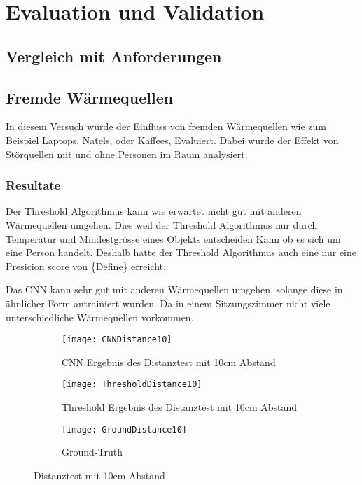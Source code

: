 \chapter{Evaluation und Validation}
\label{ch:Eval}

\section{Vergleich mit Anforderungen}
\label{sec:VergleichAnforderungen}

\section{Fremde Wärmequellen}
\label{sec:FremdeWärmequellen}

In diesem Versuch wurde der Einfluss von fremden Wärmequellen wie zum Beispiel Laptops, Natels, oder Kaffees, Evaluiert. Dabei wurde der Effekt von Störquellen mit und ohne Personen im Raum analysiert.

\subsection{Resultate}
\label{subsec:FWresultate}

Der Threshold Algorithmus kann wie erwartet nicht gut mit anderen Wärmequellen umgehen. Dies weil der Threshold Algorithmus nur durch Temperatur und Mindestgrösse eines Objekts entscheiden Kann ob es sich um eine Person handelt. Deshalb hatte der Threshold Algorithmus auch eine nur eine Presicion score von \{Define\} erreicht.

Das CNN kann sehr gut mit anderen Wärmequellen umgehen, solange diese in ähnlicher Form antrainiert wurden. Da in einem Sitzungszimmer nicht viele unterschiedliche Wärmequellen vorkommen.

\vspace{.5em}
\begin{figure}[h!]
	\begin{subfigure}{.5\linewidth}
		\texttt{[image: CNNDistance10]}
		\caption{CNN Ergebnis des Distanztest mit 10cm Abstand}
		\label{fig:cnnDistance10}
	\end{subfigure}\hfill%
	\begin{subfigure}{.5\linewidth}
		\centering
		\texttt{[image: ThresholdDistance10]}
		\caption{Threshold Ergebnis des Distanztest mit 10cm Abstand}
		\label{fig:thresholdDistance10}
	\end{subfigure}
	\begin{subfigure}{.8\linewidth}
		\centering
		\texttt{[image: GroundDistance10]}
		\caption{Ground-Truth}
		\label{fig:groundDistance10}
	\end{subfigure}
	\caption{Distanztest mit 10cm Abstand}
	\label{fig:versuchsaufbauten}
\end{figure}
\vspace{.5em}




